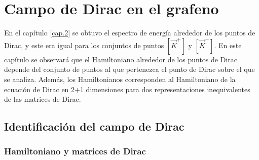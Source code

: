 \chapter{Campo de Dirac en el grafeno}
En el capítulo \ref{cap.2} se obtuvo el espectro de energía alrededor de los puntos de Dirac, y este era igual para los conjuntos de puntos $[\vec{K}^{+}]$ y $[\vec{K}^{-}]$. En este capítulo se observará que el Hamiltoniano alrededor de los puntos de Dirac depende del conjunto de puntos al que pertenezca el punto de Dirac sobre el que se analiza. Además, los Hamiltonianos corresponden al Hamiltoniano de la ecuación de Dirac en 2+1 dimensiones para dos representaciones inequivalentes de las matrices de Dirac.
\section{Identificación del campo de Dirac}
\subsection{Hamiltoniano y matrices de Dirac}

